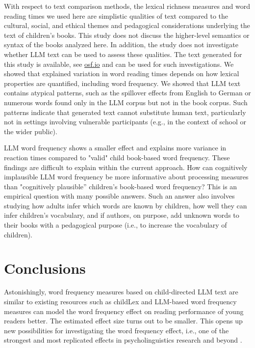 \documentclass[doc, a4paper]{apa7}
\begin{document}
With respect to text comparison methods, the lexical richness measures and word reading times we used here are simplistic qualities of text compared to the cultural, social, and ethical themes and pedagogical considerations underlying the text of children's books. This study does not discuss the higher-level semantics or syntax of the books analyzed here. In addition, the study does not investigate whether LLM text can be used to assess these qualities. The text generated for this study is available, see \href{https://osf.io/wmuvj/?view_only=06ba6b0ec23248df8a1418add4da05a0}{osf.io} and can be used for such investigations. We showed that explained variation in word reading times depends on how lexical properties are quantified, including word frequency. We showed that LLM text contains atypical patterns, such as the spillover effects from English to German or numerous words found only in the LLM corpus but not in the book corpus. Such patterns indicate that generated text cannot substitute human text, particularly not in settings involving vulnerable participants (e.g., in the context of school or the wider public). 

LLM word frequency shows a smaller effect and explains more variance in reaction times compared to "valid" child book-based word frequency. These findings are difficult to explain within the current approach. How can cognitively implausible LLM word frequency be more informative about processing measures than "cognitively plausible” children’s book-based word frequency? This is an empirical question with many possible answers. Such an answer also involves studying how adults infer which words are known by children, how well they can infer children's vocabulary, and if authors, on purpose, add unknown words to their books with a pedagogical purpose (i.e., to increase the vocabulary of children). 


\section*{Conclusions}

Astonishingly, word frequency measures based on child-directed LLM text are similar to existing resources such as childLex and LLM-based word frequency measures can model the word frequency effect on reading performance of young readers better. The estimated effect size turns out to be smaller. This opens up new possibilities for investigating the word frequency effect, i.e., one of the strongest and most replicated effects in psycholinguistics research \citep{brysbaert_word_2018} and beyond \citep{gregorova_access_2023}. 
\end{document}
